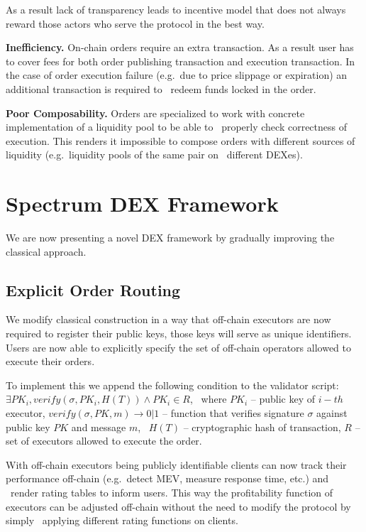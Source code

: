\documentclass[11pt]{article}
\begin{document}
\begin{sloppypar}
        As a result lack of transparency leads to incentive model that does not always reward those actors who serve the protocol in the best way.

        \textbf{Inefficiency.} On-chain orders require an extra transaction.
        As a result user has to cover fees for both order publishing transaction and execution transaction.
        In the case of order execution failure (e.g.\ due to price slippage or expiration) an additional transaction is required to \
        redeem funds locked in the order.

        \textbf{Poor Composability.} Orders are specialized to work with concrete implementation of a liquidity pool to be able to \
        properly check correctness of execution.
        This renders it impossible to compose orders with different sources of liquidity (e.g.\ liquidity pools of the same pair on \
        different DEXes).


        \section{Spectrum DEX Framework}\label{sec:spectrum-dex-framework}
        We are now presenting a novel DEX framework by gradually improving the classical approach.

        \subsection{Explicit Order Routing}\label{subsec:making-execution-transparent}
        We modify classical construction in a way that off-chain executors are now required to register their public keys, those keys will serve as unique identifiers.
        Users are now able to explicitly specify the set of off-chain operators allowed to execute their orders.

        To implement this we append the following condition to the validator script: \
        $\exists PK_i, verify(\sigma, PK_i, H(T)) \wedge PK_i \in R$, \
        where $PK_i$ -- public key of $i-th$ executor, $verify(\sigma, PK, m) \rightarrow 0 | 1$ -- function that verifies signature $\sigma$ against public key $PK$ and message $m$, \
        $H(T)$ -- cryptographic hash of transaction, $R$ -- set of executors allowed to execute the order.

        With off-chain executors being publicly identifiable clients can now track their performance off-chain (e.g.\ detect MEV, measure response time, etc.) and \
        render rating tables to inform users.
        This way the profitability function of executors can be adjusted off-chain without the need to modify the protocol by simply \
        applying different rating functions on clients.


\end{sloppypar}
\end{document}
